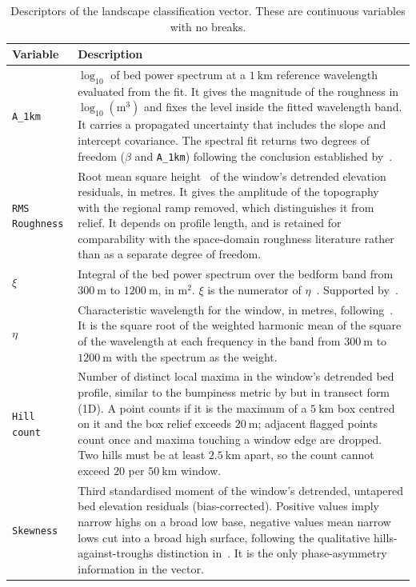 \begin{table}
\centering
\caption{Descriptors of the landscape classification vector. These are continuous variables with no breaks.}
\label{tab:descriptors}
\begin{tabularx}{\textwidth}{p{4.0cm} X}
\toprule
\textbf{Variable} & \textbf{Description} \\
\midrule
  \texttt{A\_1km} & $\log_{10}$ of bed power spectrum at a $1~\mathrm{km}$ reference wavelength evaluated from the fit. It gives the magnitude of the roughness in $\log_{10}(\mathrm{m}^3)$ and fixes the level inside the fitted wavelength band. It carries a propagated uncertainty that includes the slope and intercept covariance. The spectral fit returns two degrees of freedom ($\beta$ and \texttt{A\_1km}) following the conclusion established by~\cite{Li_2010, Jordan_2017, Rippin_2014}. \\
  \addlinespace[0.5em]
  \texttt{RMS Roughness} & Root mean square height~\cite{Shepard_1995} of the window's detrended elevation residuals, in metres. It gives the amplitude of the topography with the regional ramp removed, which distinguishes it from relief. It depends on profile length, and is retained for comparability with the space-domain roughness literature rather than as a separate degree of freedom. \\
  \addlinespace[0.5em]
  $\xi$ & Integral of the bed power spectrum over the bedform band from $300~\mathrm{m}$ to $1200~\mathrm{m}$, in $\mathrm{m^2}$. $\xi$ is the numerator of $\eta$~\cite{Li_2010}. Supported by~\cite{King_2007, Spagnolo_2017}. \\
  \addlinespace[0.5em]
  $\eta$ & Characteristic wavelength for the window, in metres, following~\cite{Li_2010}. It is the square root of the weighted harmonic mean of the square of the wavelength at each frequency in the band from $300~\mathrm{m}$ to $1200~\mathrm{m}$ with the spectrum as the weight. \\
  \addlinespace[0.5em]
  \texttt{Hill count} & Number of distinct local maxima in the window's detrended bed profile, similar to the bumpiness metric by \cite{Ockenden_2026} but in transect form (1D). A point counts if it is the maximum of a $5~\mathrm{km}$ box centred on it and the box relief exceeds $20~\mathrm{m}$; adjacent flagged points count once and maxima touching a window edge are dropped. Two hills must be at least $2.5~\mathrm{km}$ apart, so the count cannot exceed $20$ per $50~\mathrm{km}$ window. \\
  \addlinespace[0.5em]
  \texttt{Skewness} & Third standardised moment of the window's detrended, untapered bed elevation residuals (bias-corrected). Positive values imply narrow highs on a broad low base, negative values mean narrow lows cut into a broad high surface, following the qualitative hills-against-troughs distinction in~\cite{Sugden_1978}. It is the only phase-asymmetry information in the vector.\\

\end{tabularx}
\end{table}
